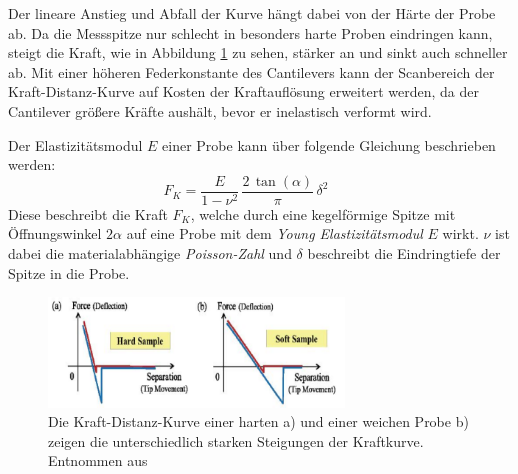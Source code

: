           \FloatBarrier
          \newpage
          Der lineare Anstieg und Abfall der Kurve hängt dabei von der Härte der Probe ab. Da die Messspitze nur schlecht in besonders harte Proben eindringen kann, steigt die Kraft, wie in Abbildung \ref{fig:force_hard_soft} zu sehen, stärker an und sinkt auch schneller ab. 
          Mit einer höheren Federkonstante des Cantilevers kann der Scanbereich der
          Kraft-Distanz-Kurve auf Kosten der Kraftauflösung erweitert werden, da der Cantilever größere Kräfte aushält, bevor er inelastisch verformt wird.

          Der Elastizitätsmodul $E$ einer Probe kann über folgende Gleichung \cite{Elastic} beschrieben werden:
          \begin{equation}
              F_K = \frac{E}{1-\nu^2}\,\frac{2\,\tan(\alpha)}{\pi}\,\delta^2 \qquad
              \label{eqn:FFF}
          \end{equation}
          Diese beschreibt die Kraft $F_K$, welche durch eine kegelförmige Spitze mit Öffnungswinkel $2\alpha$ auf eine Probe mit dem \textit{Young Elastizitätsmodul} $E$ wirkt. $\nu$ ist dabei die materialabhängige \textit{Poisson-Zahl} und $\delta$ beschreibt die Eindringtiefe der Spitze in die Probe. 



          \begin{figure}[h]
            \centering
            \includegraphics[width = 0.7\textwidth]{pictures/force_hard_soft.png}
            \caption{Die Kraft-Distanz-Kurve einer harten a) und einer weichen Probe b) zeigen die unterschiedlich starken Steigungen der Kraftkurve. Entnommen aus \cite{park_systems_force-distance_nodate}}
            \label{fig:force_hard_soft}
          \end{figure}


          \FloatBarrier






      \newpage


